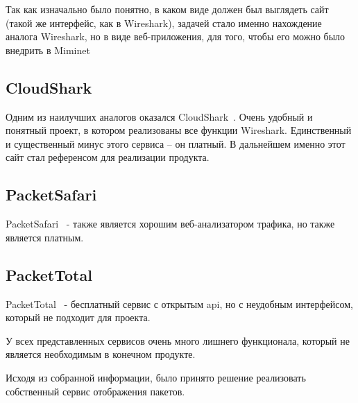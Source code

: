 
\label{sec:relatedworks}
Так как изначально было понятно, в каком виде должен был выглядеть сайт (такой же интерфейс, как в Wireshark),
задачей стало именно нахождение аналога Wireshark, но в виде веб-приложения, для того, чтобы его можно было внедрить 
в Miminet 

\subsection{CloudShark}
Одним из наилучших аналогов оказался CloudShark~\cite{CloudShark}.
Очень удобный и понятный проект, в котором реализованы все функции Wireshark.
Единственный и существенный минус этого сервиса -- он платный.
В дальнейшем именно этот сайт стал референсом для реализации продукта. 

\subsection{PacketSafari}
PacketSafari~\cite{PacketSafari} - также является хорошим веб-анализатором трафика, но также является платным.

\subsection{PacketTotal}
PacketTotal~\cite{PacketTotal} - бесплатный сервис с открытым api, но с неудобным интерфейсом, который не подходит для проекта.

У всех представленных сервисов очень много лишнего функционала, который не является необходимым в конечном продукте.

Исходя из собранной информации, было принято решение реализовать собственный сервис отображения пакетов.